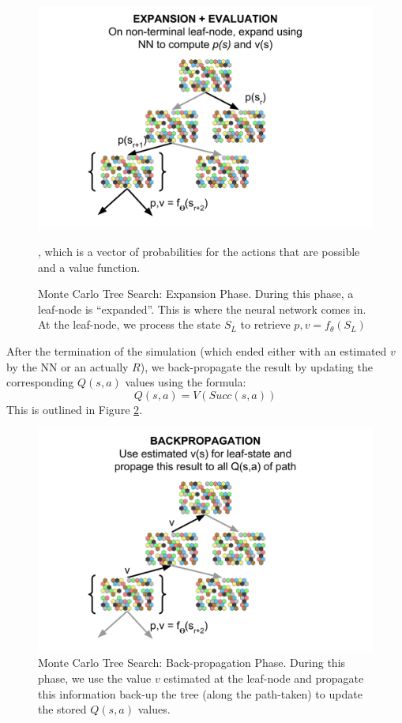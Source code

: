 \documentclass[10pt,twocolumn,letterpaper]{article}
\begin{document}
\begin{figure}
    \centering
    \includegraphics[scale=0.09]{figures/mcts-expansion.png}
    \caption{Monte Carlo Tree Search: Expansion Phase. During this phase, a leaf-node is ``expanded''. This is where the neural network comes in. At the leaf-node, we process the state $S_L$ to retrieve $p,v = f_{\theta}(S_L)$}, which is a vector of probabilities for the actions that are possible and a value function.
    \label{fig:mcts-expansion}
\end{figure}

After the termination of the simulation (which ended either with an estimated $v$ by the NN or an actually $R$), we back-propagate the result by updating the corresponding $Q(s,a)$ values using the formula:
$$
Q(s,a) = V(Succ(s,a))
$$
This is outlined in Figure \ref{fig:mcts-backpropagation}.

\begin{figure}
    \centering
    \includegraphics[scale=0.09]{figures/mcts-backpropagation.png}
    \caption{Monte Carlo Tree Search: Back-propagation Phase. During this phase, we use the value $v$ estimated at the leaf-node and propagate this information back-up the tree (along the path-taken) to update the stored $Q(s,a)$ values.}
    \label{fig:mcts-backpropagation}
\end{figure}
\end{document}
